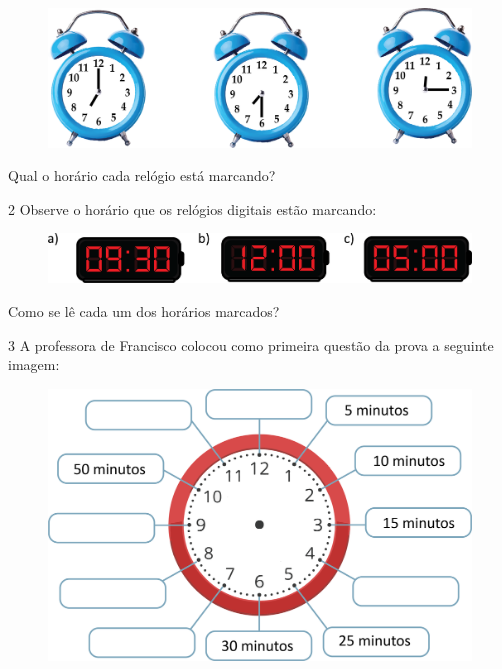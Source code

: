 \begin{figure}[htpb!]
\includegraphics[width=\textwidth]{./media/image51.png}
\end{figure}

Qual o horário cada relógio está marcando?

\num{2} Observe o horário que os relógios digitais estão marcando:

\begin{figure}[htpb!]
\includegraphics[width=\textwidth]{./media/image52.png}
\end{figure}

Como se lê cada um dos horários marcados?

\num{3} A professora de Francisco colocou como primeira questão da prova a seguinte imagem:

\begin{figure}[htpb!]
\centering
\includegraphics[width=\textwidth]{./media/image53.png}
\end{figure}

